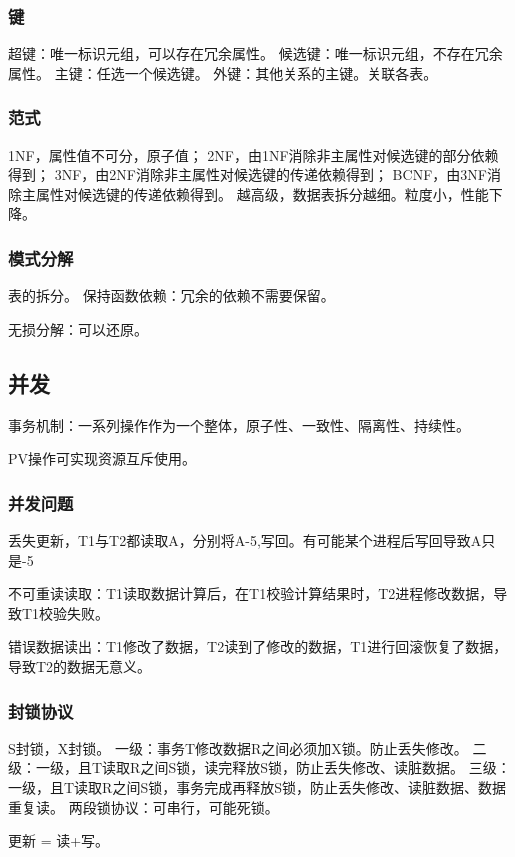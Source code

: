 \documentclass[UTF8]{../computerUniverse}
\begin{document}
\subsubsection{键}
超键：唯一标识元组，可以存在冗余属性。
候选键：唯一标识元组，不存在冗余属性。
主键：任选一个候选键。
外键：其他关系的主键。关联各表。

\subsubsection{范式}
1NF，属性值不可分，原子值；
2NF，由1NF消除非主属性对候选键的部分依赖得到；
3NF，由2NF消除非主属性对候选键的传递依赖得到；
BCNF，由3NF消除主属性对候选键的传递依赖得到。
越高级，数据表拆分越细。粒度小，性能下降。

\subsubsection{模式分解}
表的拆分。
保持函数依赖：冗余的依赖不需要保留。

无损分解：可以还原。

\subsection{并发}
事务机制：一系列操作作为一个整体，原子性、一致性、隔离性、持续性。

PV操作可实现资源互斥使用。

\subsubsection{并发问题}

丢失更新，T1与T2都读取A，分别将A-5,写回。有可能某个进程后写回导致A只是-5

不可重读读取：T1读取数据计算后，在T1校验计算结果时，T2进程修改数据，导致T1校验失败。

错误数据读出：T1修改了数据，T2读到了修改的数据，T1进行回滚恢复了数据，导致T2的数据无意义。

\subsubsection{封锁协议}
S封锁，X封锁。
一级：事务T修改数据R之间必须加X锁。防止丢失修改。
二级：一级，且T读取R之间S锁，读完释放S锁，防止丢失修改、读脏数据。
三级：一级，且T读取R之间S锁，事务完成再释放S锁，防止丢失修改、读脏数据、数据重复读。
两段锁协议：可串行，可能死锁。

更新 = 读+写。
\end{document}
